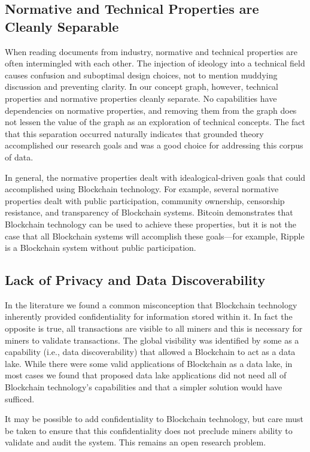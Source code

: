 \subsection{Normative and Technical Properties are Cleanly Separable}
When reading documents from industry, normative and technical properties are often intermingled with each other.
The injection of ideology into a technical field causes confusion and suboptimal design choices, not to mention muddying discussion and preventing clarity.
In our concept graph, however, technical properties and normative properties cleanly separate.
No capabilities have dependencies on normative properties, and removing them from the graph does not lessen the value of the graph as an exploration of technical concepts.
The fact that this separation occurred naturally indicates that grounded theory accomplished our research goals and was a good choice for addressing this corpus of data.

In general, the normative properties dealt with idealogical-driven goals that could accomplished using Blockchain technology.
For example, several normative properties dealt with public participation, community ownership, censorship resistance, and transparency of Blockchain systems.
Bitcoin demonstrates that Blockchain technology can be used to achieve these properties, but it is not the case that all Blockchain systems will accomplish these goals---for example, Ripple is a Blockchain system without public participation.

\subsection{Lack of Privacy and Data Discoverability}
In the literature we found a common misconception that Blockchain technology inherently provided confidentiality for information stored within it.
In fact the opposite is true, all transactions are visible to all miners and this is necessary for miners to validate transactions.
The global visibility was identified by some as a capability (i.e., data discoverability) that allowed a Blockchain to act as a data lake.
While there were some valid applications of Blockchain as a data lake, in most cases we found that proposed data lake applications did not need all of Blockchain technology's capabilities and that a simpler solution would have sufficed.

It may be possible to add confidentiality to Blockchain technology, but care must be taken to ensure that this confidentiality does not preclude miners ability to validate and audit the system.
This remains an open research problem.

